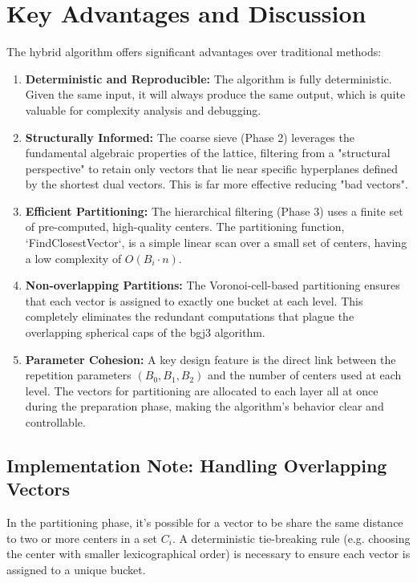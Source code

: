 \documentclass{article}
\begin{document}
\section{Key Advantages and Discussion}

The hybrid algorithm offers significant advantages over traditional methods:

\begin{enumerate}
    \item \textbf{Deterministic and Reproducible:} The algorithm is fully deterministic. Given the same input, it will always 
    produce the same output, which is quite valuable for complexity analysis and debugging.
    \item \textbf{Structurally Informed:} The coarse sieve (Phase 2) leverages the fundamental algebraic properties of the lattice, 
    filtering from a "structural perspective" to retain only vectors that lie near specific hyperplanes defined by the shortest dual 
    vectors. This is far more effective reducing "bad vectors".
    \item \textbf{Efficient Partitioning:} The hierarchical filtering (Phase 3) uses a finite set of pre-computed, 
    high-quality centers. The partitioning function, `FindClosestVector`, is a simple linear scan over a small set of 
    centers, having a low complexity of $O(B_i \cdot n)$.
    \item \textbf{Non-overlapping Partitions:} The Voronoi-cell-based partitioning ensures that each vector is assigned to 
    exactly one bucket at each level. This completely eliminates the redundant computations that plague the overlapping spherical 
    caps of the bgj3 algorithm.
    \item \textbf{Parameter Cohesion:} A key design feature is the direct link between the repetition parameters $(B_0, B_1, B_2)$ and the number of centers used at each level. The vectors for partitioning are allocated to each layer all at once during the preparation phase, making the algorithm's behavior clear and controllable.
\end{enumerate}

\subsection{Implementation Note: Handling Overlapping Vectors}
In the partitioning phase, it's possible for a vector to be share the same distance to two or more centers in a set $C_i$. 
A deterministic tie-breaking rule (e.g. choosing the center with smaller lexicographical order) is necessary to 
ensure each vector is assigned to a unique bucket. 
\end{document}
